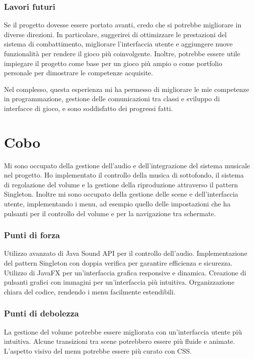 \documentclass[a4paper,12pt]{report}
\begin{document}
\subsubsection{Lavori futuri}
Se il progetto dovesse essere portato avanti, credo che si potrebbe migliorare in diverse direzioni. In particolare, suggerirei di ottimizzare le prestazioni del sistema di combattimento, migliorare l'interfaccia utente e aggiungere nuove funzionalità per rendere il gioco più coinvolgente. Inoltre, potrebbe essere utile impiegare il progetto come base per un gioco più ampio o come portfolio personale per dimostrare le competenze acquisite.

Nel complesso, questa esperienza mi ha permesso di migliorare le mie competenze in programmazione, gestione delle comunicazioni tra classi e sviluppo di interfacce di gioco, e sono soddisfatto dei progressi fatti.

\section{Cobo}
Mi sono occupato della gestione dell’audio e dell’integrazione del sistema musicale nel progetto. Ho implementato il controllo della musica di sottofondo, il sistema di regolazione del volume e la gestione della riproduzione attraverso il pattern Singleton. Inoltre mi sono occupato della gestione delle scene e dell’interfaccia utente, implementando i menu, ad esempio quello delle impostazioni che ha pulsanti per il controllo del volume e per la navigazione tra schermate.

\subsubsection{Punti di forza}
Utilizzo avanzato di Java Sound API per il controllo dell’audio.
Implementazione del pattern Singleton con doppia verifica per garantire efficienza e sicurezza.
Utilizzo di JavaFX per un'interfaccia grafica responsive e dinamica.
Creazione di pulsanti grafici con immagini per un’interfaccia più intuitiva.
Organizzazione chiara del codice, rendendo i menu facilmente estendibili.
\subsubsection{Punti di debolezza}
La gestione del volume potrebbe essere migliorata con un'interfaccia utente più intuitiva.
Alcune transizioni tra scene potrebbero essere più fluide e animate.
L’aspetto visivo del menu potrebbe essere più curato con CSS.
\end{document}
